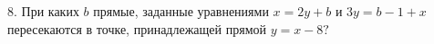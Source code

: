 8. При каких $b$ прямые, заданные уравнениями $x=2y+b$ и $3y=b-1+x$ пересекаются в точке, принадлежащей прямой $y=x-8?$\\
